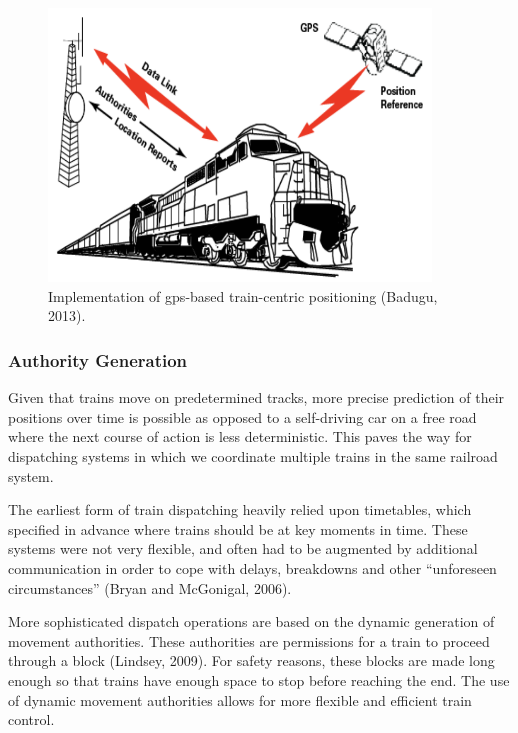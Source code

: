 \documentclass[11pt, titlepage]{article}
\begin{document}
\begin{figure}[ht]
    \begin{center}
        \includegraphics[width=4in]{PTCDiagram.png}
        \caption[GPS-based train-centric positioning]{Implementation of \gls{gps}-based
        train-centric positioning (Badugu, 2013).}
    \end{center}
\end{figure}

\subsubsection{Authority Generation}

Given that trains move on predetermined tracks, more precise prediction of their
positions over time is possible as opposed to a self-driving car on a free road
where the next course of action is less deterministic. This paves the way for
dispatching systems in which we coordinate multiple trains in the same railroad
system.

The earliest form of train dispatching heavily relied upon timetables, which
specified in advance where trains should be at key moments in time. These systems
were not very flexible, and often had to be augmented by additional communication
in order to cope with delays, breakdowns and other ``unforeseen circumstances''
(Bryan and McGonigal, 2006).

More sophisticated dispatch operations are based on the dynamic generation of
movement authorities. These authorities are permissions for a train to proceed
through a block (Lindsey, 2009). For safety reasons, these blocks are made long
enough so that trains have enough space to stop before reaching the end. The use of
dynamic movement authorities allows for more flexible and efficient train control.
\end{document}
